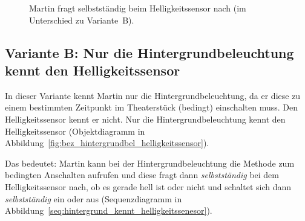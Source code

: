 \documentclass[11pt, a4paper]{scrartcl}
\begin{document}
\hfill
\begin{figure}[H]
\centering
{}
\caption{Martin fragt selbstständig beim Helligkeitssensor nach (im Unterschied zu Variante~B).}
\label{seq:klassische_situation_martin_kennt_hg_hs}
\end{figure}












\newpage
\subsection*{Variante B: Nur die Hintergrundbeleuchtung kennt den Helligkeitssensor}
In dieser Variante kennt Martin nur die Hintergrundbeleuchtung, da er diese zu einem bestimmten Zeitpunkt im Theaterstück (bedingt) einschalten muss. Den Helligkeitssensor kennt er nicht. Nur die Hintergrundbeleuchtung kennt den Helligkeitssensor (Objektdiagramm in Abbildung~\ref{fig:bez_hintergrundbel_helligkeitssensor}).

Das bedeutet: Martin kann bei der Hintergrundbeleuchtung die Methode zum bedingten Anschalten aufrufen und diese fragt dann \emph{selbstständig} bei dem Helligkeitssensor nach, ob es gerade hell ist oder nicht und schaltet sich dann \emph{selbstständig} ein oder aus (Sequenzdiagramm in Abbildung~\ref{seq:hintergrund_kennt_helligkeitssenesor}).
\end{document}
